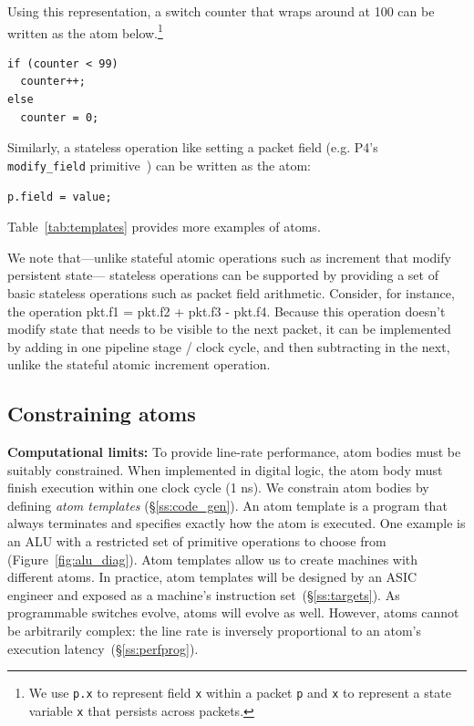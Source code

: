 Using this representation, a switch counter that wraps around at 100
can be written as the atom below.\footnote{We use {\tt p.x} to
  represent field {\tt x} within a packet {\tt p} and {\tt x} to
  represent a state variable {\tt x} that persists across packets.}
\begin{lstlisting}[style=customc, numbers=none, frame=none]
if (counter < 99)
  counter++;
else
  counter = 0;
\end{lstlisting}
Similarly, a stateless operation like setting a packet field (e.g. P4's {\tt
modify\_field} primitive~\cite{p4spec}) can be written as the atom:
\begin{lstlisting}[style=customc, numbers=none, frame=none]
  p.field = value;
\end{lstlisting}
Table~\ref{tab:templates} provides more examples of atoms.

We note that---unlike stateful atomic operations such as increment that modify
persistent state--- stateless operations can be supported by providing a set of
basic stateless operations such as packet field arithmetic. Consider, for
instance, the operation pkt.f1 = pkt.f2 + pkt.f3 - pkt.f4. Because this
operation doesn't modify state that needs to be visible to the next packet, it
can be implemented by adding in one pipeline stage / clock cycle, and then
subtracting in the next, unlike the stateful atomic increment operation.
\subsection{Constraining atoms}
\label{s:atomConstraints}

\textbf{Computational limits:}
To provide line-rate performance, atom bodies must be suitably constrained.
When implemented in digital logic, the atom body must finish execution within
one clock cycle (1 ns). We constrain atom bodies by defining {\it atom
templates} (\S\ref{ss:code_gen}).  An atom template is a program that always
terminates and specifies exactly how the atom is executed. One example is an
ALU with a restricted set of primitive operations to choose from
(Figure~\ref{fig:alu_diag}). Atom templates allow us to create \absmachine
machines with different atoms.  In practice, atom templates will be designed by
an ASIC engineer and exposed as a machine's instruction
set~(\S\ref{ss:targets}).  As programmable switches evolve, atoms will evolve
as well.  However, atoms cannot be arbitrarily complex: the line rate is
inversely proportional to an atom's execution latency~(\S\ref{ss:perfprog}).

